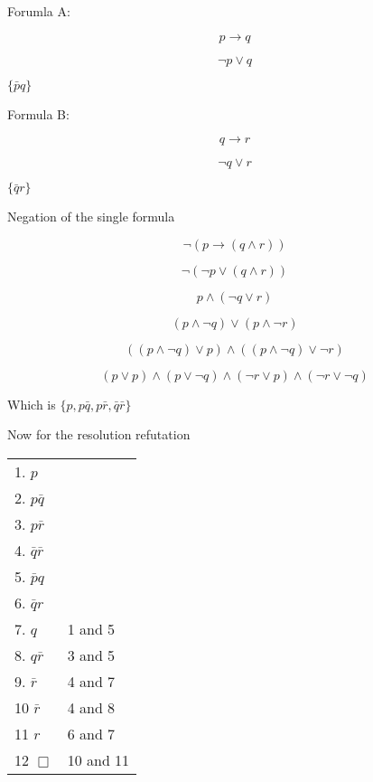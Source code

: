 \documentclass[10pt,a4paper]{article}
\begin{document}
Forumla A:

\begin{equation}
 p\rightarrow q
\end{equation}

\begin{equation}
 \neg p\vee q
\end{equation}

$\{\bar{p}q\}$

Formula B:

\begin{equation}
 q \rightarrow r
\end{equation}

\begin{equation}
 \neg q \vee r
\end{equation}


$\{\bar{q}r\}$


Negation of the single formula

\begin{equation}
 \neg(p\rightarrow (q\wedge r))
\end{equation}

\begin{equation}
 \neg(\neg p \vee (q \wedge r))
\end{equation}

\begin{equation}
 p \wedge (\neg q\vee r)
\end{equation}

\begin{equation}
 (p\wedge \neg q)\vee (p\wedge \neg r)
\end{equation}

\begin{equation}
 ((p\wedge \neg q) \vee p)\wedge((p\wedge\neg q)\vee \neg r)
\end{equation}

\begin{equation}
 (p\vee p)\wedge (p\vee \neg q)\wedge(\neg r \vee p)\wedge (\neg r \vee \neg q)
\end{equation}

Which is $\{p,p\bar{q},p\bar{r},\bar{q}\bar{r} \}$

Now for the resolution refutation


\begin{tabular}{ll}
1. $p$  &\\
2. $p\bar{q}$   &\\
3. $p\bar{r}$ &\\
4. $\bar{q}\bar{r}$  &\\
5. $\bar{p}q$   &           \\
6. $\bar{q}r$   &           \\
7. $q$  &           1 and 5\\
8. $q\bar{r}$   &           3 and 5\\
9. $\bar{r}$  &           4 and 7\\
10 $\bar{r}$   &           4 and 8\\
11 $r$   &           6 and 7\\
12 $\Box$   &           10 and 11\\
\end{tabular}
\end{document}
